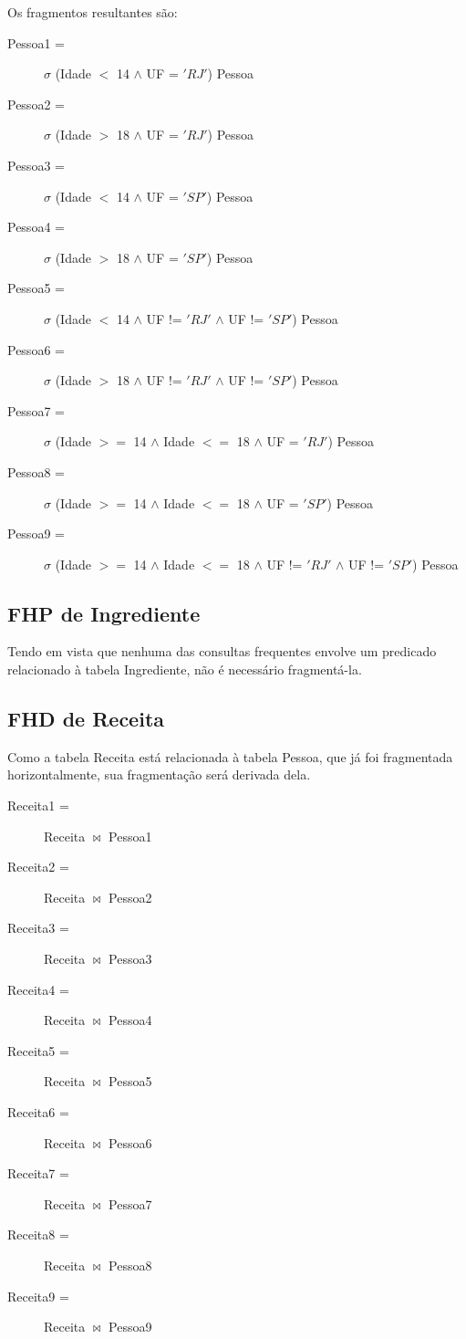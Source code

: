 \documentclass[12pt,a4paper]{article}
\begin{document}
\noindent
\begin{flushleft}
	Os fragmentos resultantes são:
	\begin{description}
		\item[Pessoa1 =] $\sigma$ (Idade $<$ 14 $\wedge$ UF = $'RJ'$) Pessoa
		\item[Pessoa2 =] $\sigma$ (Idade $>$ 18 $\wedge$ UF = $'RJ'$) Pessoa
		\item[Pessoa3 =] $\sigma$ (Idade $<$ 14 $\wedge$ UF = $'SP'$) Pessoa
		\item[Pessoa4 =] $\sigma$ (Idade $>$ 18 $\wedge$ UF = $'SP'$) Pessoa
		\item[Pessoa5 =] $\sigma$ (Idade $<$ 14 $\wedge$ UF != $'RJ'$ $\wedge$ UF != $'SP'$) Pessoa
		\item[Pessoa6 =] $\sigma$ (Idade $>$ 18 $\wedge$ UF != $'RJ'$ $\wedge$ UF != $'SP'$) Pessoa
		\item[Pessoa7 =] $\sigma$ (Idade $>=$ 14 $\wedge$ Idade $<=$ 18 $\wedge$ UF = $'RJ'$) Pessoa
		\item[Pessoa8 =] $\sigma$ (Idade $>=$ 14 $\wedge$ Idade $<=$ 18 $\wedge$ UF = $'SP'$) Pessoa
		\item[Pessoa9 =] $\sigma$ (Idade $>=$ 14 $\wedge$ Idade $<=$ 18 $\wedge$ UF != $'RJ'$ $\wedge$ UF != $'SP'$) Pessoa
	\end{description}
\end{flushleft}

\subsection{FHP de Ingrediente}

Tendo em vista que nenhuma das consultas frequentes envolve um predicado relacionado à tabela Ingrediente, não é necessário fragmentá-la.

\subsection{FHD de Receita}

Como a tabela Receita está relacionada à tabela Pessoa, que já foi fragmentada horizontalmente, sua fragmentação será derivada dela.

\begin{flushleft}
	\begin{description}
		\item[Receita1 =] Receita $\bowtie$ Pessoa1
		\item[Receita2 =] Receita $\bowtie$ Pessoa2
		\item[Receita3 =] Receita $\bowtie$ Pessoa3
		\item[Receita4 =] Receita $\bowtie$ Pessoa4
		\item[Receita5 =] Receita $\bowtie$ Pessoa5
		\item[Receita6 =] Receita $\bowtie$ Pessoa6
		\item[Receita7 =] Receita $\bowtie$ Pessoa7
		\item[Receita8 =] Receita $\bowtie$ Pessoa8
		\item[Receita9 =] Receita $\bowtie$ Pessoa9
	\end{description}
\end{flushleft}
\end{document}
